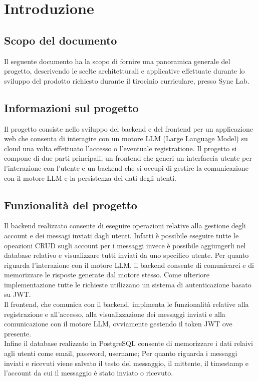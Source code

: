 \section{Introduzione}
\subsection{Scopo del documento}
    Il seguente documento ha la scopo di fornire una panoramica generale del progetto,
    descrivendo le scelte architetturali e applicative effettuate durante lo sviluppo 
    del prodotto richiesto durante il tirocinio curriculare, presso Sync Lab.
\subsection{Informazioni sul progetto}
    Il progetto consiste nello sviluppo del backend e del frontend per un 
    applicazione web che consenta di interagire con un motore LLM 
    (Large Language Model) su cloud una volta effettuato l'accesso o l'eventuale 
    registratione. Il progetto si compone di due parti principali, un frontend 
    che generi un interfaccia utente per l'interazione con l'utente e un backend 
    che si occupi di gestire la comunicazione con il motore LLM e la persistenza 
    dei dati degli utenti.

\subsection{Funzionalità del progetto}
    Il backend realizzato consente di eseguire operazioni relative alla gestione 
    degli account e dei messagi inviati dagli utenti. Infatti è possibile eseguire 
    tutte le opeazioni CRUD sugli account per i messaggi invece è possibile 
    aggiungerli nel database relativo e visualizzare tutti inviati da uno 
    specifico utente. Per quanto riguarda l'interazione con il motore LLM, 
    il backend consente di comunicarci e di memorizzare le risposte generate 
    dal motore stesso. Come ulteriore implementazione tutte le richieste utilizzano 
    un sistema di autenticazione basato su JWT.\\
    Il frontend, che comunica con il backend, implmenta le funzionalità relative 
    alla registrazione e all'accesso, alla visualizzazione dei messaggi inviati 
    e alla comunicazione con il motore LLM, ovviamente gestendo il token JWT ove presente.\\
    Infine il database realizzato in PostgreSQL consente di memorizzare i dati relaivi 
    agli utenti come email, password, username; Per quanto riguarda i messaggi 
    inviati e ricevuti viene salvato il testo del messaggio, il mittente, il timestamp 
    e l'account da cui il messaggio è stato inviato o ricevuto.